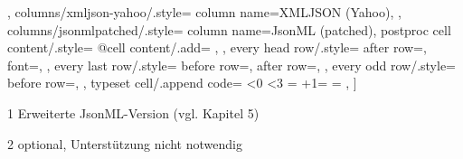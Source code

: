 \begin{threeparttable}
{    },
    columns/xmljson-yahoo/.style={
        column name=XMLJSON (Yahoo),
    },
    columns/jsonmlpatched/.style={
        column name={JsonML (patched)},
        postproc cell content/.style={%
            @cell content/.add={
               }{}
        },
    },
    every head row/.style={
        after row=\toprule,
        font=\selectfont,
    },
    every last row/.style={
        before row=\midrule,
        after row=\bottomrule,
    },
    every odd row/.style={
        before row={},
    },
    typeset cell/.append code={%
        \ifnum\pgfplotstablerow<0%
            \ifnum\pgfplotstablecol<3
            \else
                \ifnum\pgfplotstablecol=\pgfplotstablecols
                \else
                \fi
            \fi
        \fi
        \ifnum\numexpr\pgfplotstablerow+1=\pgfplotstablerows
            \ifnum\pgfplotstablecol=\pgfplotstablecols
            \else
            \fi
        \fi
    },
]\loadedtable
    \begin{tablenotes}
        \item[1] Erweiterte JsonML-Version (vgl. Kapitel 5)
        \ifx\hasfootnote\undefined
        \else
    \item[2] optional, Unterst{\"u}tzung nicht notwendig
        \fi
    \end{tablenotes}
  \end{threeparttable}\hspace{2em}

